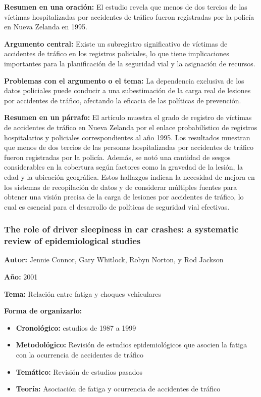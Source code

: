 \documentclass{book}
\begin{document}
\textbf{Resumen en una oración:} El estudio revela que menos de dos tercios de las víctimas hospitalizadas por accidentes de tráfico fueron registradas por la policía en Nueva Zelanda en 1995.

\textbf{Argumento central:} Existe un subregistro significativo de víctimas de accidentes de tráfico en los registros policiales, lo que tiene implicaciones importantes para la planificación de la seguridad vial y la asignación de recursos.

\textbf{Problemas con el argumento o el tema:} La dependencia exclusiva de los datos policiales puede conducir a una subestimación de la carga real de lesiones por accidentes de tráfico, afectando la eficacia de las políticas de prevención.

\textbf{Resumen en un párrafo:} El artículo muestra el grado de registro de víctimas de accidentes de tráfico en Nueva Zelanda por el enlace probabilístico de registros hospitalarios y policiales correspondientes al año 1995. 
Los resultados muestran que menos de dos tercios de las personas hospitalizadas por accidentes de tráfico fueron registradas por la policía. Además, se notó una cantidad de sesgos considerables en la cobertura según factores como la gravedad de la lesión, la edad y la ubicación geográfica. 
Estos hallazgos indican la necesidad de mejora en los sistemas de recopilación de datos y de considerar múltiples fuentes para obtener una visión precisa de la carga de lesiones por accidentes de tráfico, lo cual es esencial para el desarrollo de políticas de seguridad vial efectivas.


\subsubsection{The role of driver sleepiness in car crashes: a systematic review of epidemiological studies}
\textbf{Autor:} Jennie Connor, Gary Whitlock, Robyn Norton, y Rod Jackson

\textbf{Año:} 2001

\textbf{Tema:} Relación entre fatiga y choques vehiculares

\textbf{Forma de organizarlo:}
\begin{itemize}
\setlength{\itemindent}{0.5in}
    \item \textbf{Cronológico:} estudios de 1987 a 1999
    \item \textbf{Metodológico:} Revisión de estudios epidemiológicos que asocien la fatiga con la ocurrencia de accidentes de tráfico
    \item \textbf{Temático:} Revisión de estudios pasados

    \item \textbf{Teoría:} Asociación de fatiga y ocurrencia de accidentes de tráfico
\end{itemize}
\end{document}
